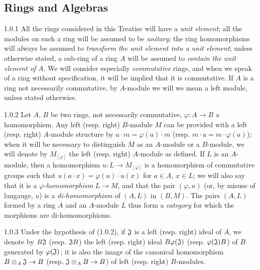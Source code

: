 \documentclass[../main.tex]{subfiles}
\begin{document}
\subsection{Rings and Algebras}

\begin{cx}{1.0.1}
All the rings considered in this Treatise will have a \emph{unit element}; all the modules
on such a ring will be assumed to be \emph{unitary}; the ring homomorphisms will always be
assumed to \emph{transform the unit element into a unit element}; unless otherwise stated,
a sub-ring of a ring $A$ will be assumed to \emph{contain the unit element of} $A$. We will
consider especially \emph{commutative} rings, and when we speak of a ring without
specification, it
will be implied that it is commutative. If $A$ is a ring not necessarily commutative, by
$A$-module we will we mean a left module, unless stated otherwise.
\end{cx}

\begin{cx}{1.0.2}
Let $A$, $B$ be two rings, not necessarily commutative, $\varphi:A\to B$ a homomorphism.
Any left (resp. right) $B$-module $M$ can be provided with a left (resp. right) $A$-module
structure by $a\cdot m=\varphi(a)\cdot m$ (resp. $m\cdot a=m\cdot\varphi(a)$); when it will
be necessary to distinguish $M$ as an $A$-module or a $B$-module, we will denote by
$M_{[\varphi]}$ the left (resp. right) $A$-module as defined. If $L$ is an $A$-module, then
a homomorphism $u:L\to M_{[\varphi]}$ is a homomorphism of commutative groups such that
$u(a\cdot x)=\varphi(a)\cdot u(x)$ for $a\in A$, $x\in L$; we will also say that it is a
$\varphi$-\emph{homomorphism} $L\to M$,
and that the pair $(\varphi,u)$ (or, by misuse of langauge, $u$)
is a \emph{di-homomorphism} of $(A,L)$ in $(B,M)$. The pairs $(A,L)$ formed by a ring $A$
and an $A$-module $L$ thus form a \emph{category} for which the morphisms are
di-homomorphisms.
\end{cx}

\begin{cx}{1.0.3}
Under the hypothesis of (1.0.2), if $\mathfrak{J}$ is a left (resp. right) ideal of $A$, we
denote by $B\mathfrak{J}$ (resp. $\mathfrak{J}B$) the left (resp. right) ideal $B\varphi(\mathfrak{J})$
(resp. $\varphi(\mathfrak{J})B$) of $B$ generated by $\varphi(\mathfrak{J})$; it is also the image
of the canonical homomorphism $B\otimes_A\mathfrak{J}\to B$ (resp. $\mathfrak{J}\otimes_A B\to B$)
of left (resp. right) $B$-modules.
\end{cx}
\end{document}
